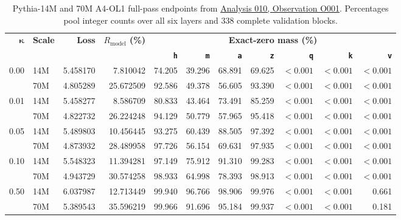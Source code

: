\documentclass[10pt,a4paper]{article}
\newcommand{\Rmodel}{\ensuremath{R_{\mathrm{model}}}}
\newcommand{\code}[1]{\texttt{#1}}
\begin{document}
{\scriptsize
\begin{table}[htbp]
\centering
\caption{Pythia-14M and 70M A4-OL1 full-pass endpoints from \href{../../../analyses/010-2026-09-01-pythia14m-vs-70m-selected-ladder/observations/O001-pythia14m-vs-70m-selected-ladder.md}{Analysis 010, Observation O001}. Percentages pool integer counts over all six layers and 338 complete validation blocks.}
\label{tab:a4-ol1-scale}
\setlength{\tabcolsep}{1.6pt}
\begin{tabular*}{\textwidth}{@{\extracolsep{\fill}}rl*{9}{r}@{}}
\toprule
$\boldsymbol{\kappa}$ & \textbf{Scale} & \textbf{Loss} & \textbf{\Rmodel{} (\%)} & \multicolumn{7}{c}{\textbf{Exact-zero mass (\%)}} \\
\cmidrule(l){5-11}
& & & & \textbf{\code{h}} & \textbf{\code{m}} & \textbf{\code{a}} & \textbf{\code{z}} & \textbf{\code{q}} & \textbf{\code{k}} & \textbf{\code{v}} \\
\midrule
\multirow{2}{*}{0.00} & 14M & 5.458170 & 7.810042 & 74.205 & 39.296 & 68.891 & 69.625 & $<0.001$ & $<0.001$ & $<0.001$ \\
                       & 70M & 4.805289 & 25.672509 & 92.586 & 49.378 & 56.605 & 93.390 & $<0.001$ & $<0.001$ & $<0.001$ \\
\hline
\multirow{2}{*}{0.01} & 14M & 5.458277 & 8.586709 & 80.833 & 43.464 & 73.491 & 85.259 & $<0.001$ & $<0.001$ & $<0.001$ \\
                       & 70M & 4.822732 & 26.224248 & 94.129 & 50.779 & 57.965 & 95.418 & $<0.001$ & $<0.001$ & $<0.001$ \\
\hline
\multirow{2}{*}{0.05} & 14M & 5.489803 & 10.456445 & 93.275 & 60.439 & 88.505 & 97.392 & $<0.001$ & $<0.001$ & $<0.001$ \\
                       & 70M & 4.873932 & 28.489958 & 97.726 & 56.154 & 69.631 & 97.935 & $<0.001$ & $<0.001$ & $<0.001$ \\
\hline
\multirow{2}{*}{0.10} & 14M & 5.548323 & 11.394281 & 97.149 & 75.912 & 91.310 & 99.283 & $<0.001$ & $<0.001$ & $<0.001$ \\
                       & 70M & 4.943729 & 30.574258 & 98.933 & 64.998 & 78.393 & 98.913 & $<0.001$ & $<0.001$ & $<0.001$ \\
\hline
\multirow{2}{*}{0.50} & 14M & 6.037987 & 12.713449 & 99.940 & 96.766 & 98.906 & 99.976 & $<0.001$ & $<0.001$ & 0.661 \\
                       & 70M & 5.389543 & 35.596219 & 99.966 & 91.696 & 95.184 & 99.937 & $<0.001$ & $<0.001$ & 0.181 \\
\bottomrule
\end{tabular*}
\end{table}}
\FloatBarrier
\end{document}
